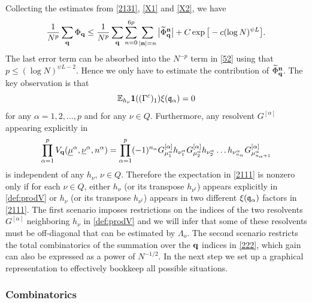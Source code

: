 \documentclass[draft]{article}
\newcommand{\wt}{\widetilde}
\newcommand{\unu}{{\underline {\nu}}}
\newcommand{\umu}{{\underline {\mu}}}
\newcommand{\bq}{{\bf {q}}}
\newcommand{\fq}{{\frak q}}
\newcommand{\sa}{{[\alpha ]}}
\newcommand{\al}{\alpha}
\newcommand{\be}{\begin{equation}}
\newcommand{\ee}{\end{equation}}
\newcommand{\E}{{\mathbb E }}
\numberwithin{equation}{section}
\numberwithin{theorem}{section}
\numberwithin{definition}{section}
\numberwithin{remark}{section}
\begin{document}
Collecting the estimates from  \eqref{2131}, \eqref{X1} and \eqref{X2}, we 
have
\be
\frac{1}{N^p}  \sum_{\bq}   \Phi_{\bq}
\le  \frac{ 1 }{N^p}  \sum_{\bq}    \sum_{n=0}^{6p}  \sum_{ |{\bf n} | =n} 
\big| \wt \Phi_{\bq}^{\bf n}\big| + C\exp{\big[-c(\log N)^{\psi L } \big]}.
\label{222}
\ee
 The last error term can be absorbed into the $N^{-p}$ term in \eqref{52}
using that $p\le (\log N)^{\psi L -2}$.  
Hence we only have to estimate the contribution of $ \wt \Phi_{\bq}^{\bf n}$.
The key observation is that
\be
   \E_{h_\nu} {\bf 1}( (\Gamma^c)_1) \xi(\fq_\al) =0
\label{obs}
\ee
for any $\al=1,2,\ldots, p$ and for any $\nu\in Q $.
Furthermore, any resolvent $G^{[\al]}$
appearing explicitly in
\be\label{def:prodV}
\prod_{\alpha=1}^{p}   V_\bq( \umu^\alpha, \unu^\alpha, n^\al)
=  \prod_{\alpha=1}^{p} (-1)^{n_\al}G^{\sa }_{\mu^\alpha_1} h_{\nu^\alpha_1}
 G^{\sa }_{\mu^\alpha_2}h_{\nu^\alpha_2} \ldots 
 h_{\nu^\alpha_{n_\al}} G^{\sa }_{\mu^\alpha_{n_\alpha+1}} 
\ee
is independent of
any $h_\nu$, $\nu\in Q$. Therefore the expectation 
in \eqref{2111} is nonzero only if for each $\nu\in Q$, 
either $h_\nu$ (or its transpose $h_{\nu^t}$) 
appears explicitly in \eqref{def:prodV} or 
$h_\nu$ (or its transpose $h_{\nu^t}$)
 appears in two different $\xi(\fq_\al)$ factors
in \eqref{2111}. 
 The first scenario imposes restrictions on 
the indices of the two resolvents $ G^{\sa }$ neighboring $h_\nu$
in \eqref{def:prodV} and we will infer that some of these
resolvents must be off-diagonal that can be estimated by
 $\Lambda_o$. The second scenario restricts the total
combinatorics of the summation over the $\bq$ indices
in \eqref{222}, which gain can also be expressed 
as a power of $N^{-1/2}$. In the next step we
set up a graphical representation to effectively bookkeep
all possible situations.



\medskip



\subsubsection{Combinatorics}  
\end{document}
